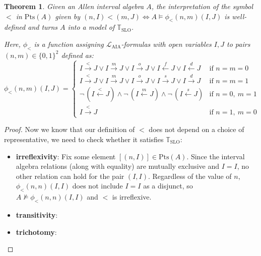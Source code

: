 \documentclass[11pt %
              ]{article}
\newcommand{\lang}{\mathcal{L}}
\newcommand{\theory}{\mathbb{T}}
\newcommand{\tslo}{\theory_\text{SLO}}
\newcommand{\laia}{\lang_\text{AIA}}
\newcommand{\before}{\overset{<}{\longrightarrow}}
\newcommand{\meets}{\overset{m}{\longrightarrow}}
\newcommand{\overlaps}{\overset{o}{\longrightarrow}}
\newcommand{\starts}{\overset{s}{\longrightarrow}}
\newcommand{\contained}{\overset{d}{\longrightarrow}}
\newcommand{\after}{\overset{<}{\longleftarrow}}
\newcommand{\metby}{\overset{m}{\longleftarrow}}
\newcommand{\startedby}{\overset{s}{\longleftarrow}}
\newcommand{\finishedby}{\overset{f}{\longleftarrow}}
\newcommand{\contains}{\overset{d}{\longleftarrow}}
\newcommand{\plt}{\phi_<}
\newcommand{\points}[1][-]{\text{Pts}\left(#1\right)}
\theoremstyle{plain}
\newtheorem{thm}{Theorem}%
\theoremstyle{definition}
\theoremstyle{remark}
\begin{document}
\begin{thm}
  Given an Allen interval algebra $A$, the interpretation of the symbol $<$ in $\points[A]$ given by
  $(n,I) < (m,J) \iff A \models \plt(n,m)(I,J)$ is well-defined and turns $A$ into a model of
  $\tslo$.

  Here, $\plt$ is a function assigning $\laia$-formulas with open variables $I,J$ to pairs
  $(n,m) \in \{0,1\}^2$ defined as:
  \begin{equation*}
    \plt(n,m)(I,J) = \begin{cases}
      I \before J \lor I \meets J \lor I \overlaps J  \lor I \finishedby J \lor I \contains J
                                                & \text{if } n = m = 0\\
        I \before J \lor I \meets J \lor I \overlaps J \lor I \starts J \lor I \contained J
                                                & \text{if } n = m = 1 \\
      \lnot\,(I \after J) \land \lnot\,(I \metby J) \land \lnot\,(I \startedby J)                      
                                                & \text{if } n = 0,\ m = 1 \\
      I \before J                               & \text{if } n = 1,\ m = 0
    \end{cases}
  \end{equation*}
\end{thm}
\begin{proof}

  Now we know that our definition of $<$ does not depend on a choice of representative, we need
  to check whether it satisfies $\tslo$:
  \begin{itemize}
    \item \textbf{irreflexivity}: Fix some element $[(n,I)] \in \points[A]$. Since the interval
      algebra relations (along with equality) are mutually exclusive and $I = I$, no other relation
      can hold for the pair $(I,I)$. Regardless of the value of $n$, $\plt(n,n)(I,I)$ does not
      include $I = I$ as a disjunct, so $A \not\models \plt(n,n)(I,I)$ and $<$ is irreflexive.
    \item \textbf{transitivity}:
    \item \textbf{trichotomy}:
  \end{itemize}
\end{proof}

\end{document}

